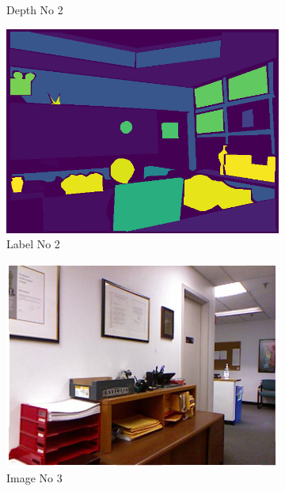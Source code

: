 \documentclass[a4paper, openany]{book}
\begin{document}
\begin{figure}[ht]
\begin{subfigure}[b]{0.3\linewidth}
    \caption{Depth No 2}
  \end{subfigure}
    \begin{subfigure}[b]{0.3\linewidth}
    \includegraphics[width=\linewidth]{images/labelNo12.png}
    \caption{Label No 2}
  \end{subfigure}
  \begin{subfigure}[b]{0.3\linewidth}
    \includegraphics[width=\linewidth]{images/imgNo8.png}
    \caption{Image No 3}
  \end{subfigure}
  \begin{subfigure}[b]{0.3\linewidth}

\end{subfigure}
\end{figure}
\end{document}
